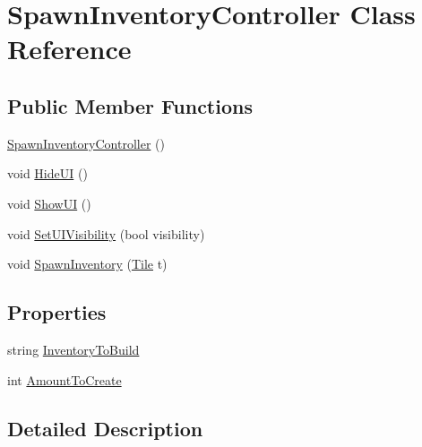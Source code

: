 \hypertarget{class_spawn_inventory_controller}{}\section{Spawn\+Inventory\+Controller Class Reference}
\label{class_spawn_inventory_controller}
\subsection*{Public Member Functions}
\begin{DoxyCompactItemize}
\item 
\hyperlink{class_spawn_inventory_controller_a6446e7323aa90da840b618b875f26848}{Spawn\+Inventory\+Controller} ()
\item 
void \hyperlink{class_spawn_inventory_controller_a62257b3a9e83f0acb2d87ac2392fc3f6}{Hide\+UI} ()
\item 
void \hyperlink{class_spawn_inventory_controller_a691618413e114fb1dc2396696f3885b8}{Show\+UI} ()
\item 
void \hyperlink{class_spawn_inventory_controller_a80bf848ab041a5acf53b76558062fbbd}{Set\+U\+I\+Visibility} (bool visibility)
\item 
void \hyperlink{class_spawn_inventory_controller_a99169b5a397cc3ca5d00a4af9ff7486a}{Spawn\+Inventory} (\hyperlink{class_tile}{Tile} t)
\end{DoxyCompactItemize}
\subsection*{Properties}
\begin{DoxyCompactItemize}
\item 
string \hyperlink{class_spawn_inventory_controller_afec19a2cf637db46f26769dc33b89782}{Inventory\+To\+Build}
\item 
int \hyperlink{class_spawn_inventory_controller_a93e88f3a636946c165bccf1c4dfbafb8}{Amount\+To\+Create}
\end{DoxyCompactItemize}


\subsection{Detailed Description}



